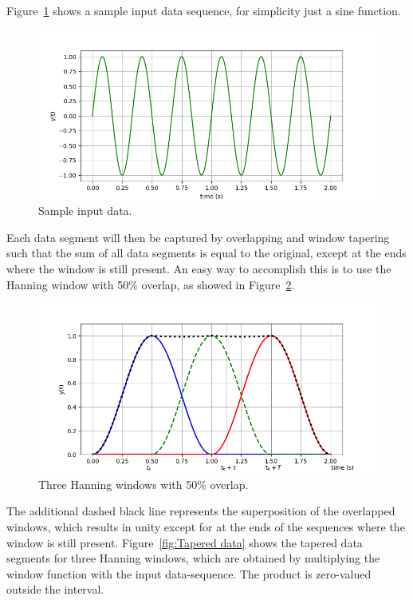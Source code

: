 Figure~\ref{fig:Sample Input} shows a sample input data sequence,
for simplicity just a sine function.
%
\begin{figure}[tb]
\includegraphics[width=\textwidth]{Figures/input}
\caption{Sample input data.}
\label{fig:Sample Input}
\end{figure}
%
Each data segment will then be captured by overlapping and window tapering
such that the sum of all data segments is equal to the original,
except at the ends where the window is still present.
An easy way to accomplish this is to use the Hanning window with 50\% overlap,
as showed in Figure~\ref{fig:Overlapping Hanning}.
%
\begin{figure}[!tb]
\center
\includegraphics[width=\textwidth]{Figures/movingHenning}
\caption{Three Hanning windows with 50\% overlap.}
\label{fig:Overlapping Hanning}
\end{figure}
%
The additional dashed black line represents the superposition of the overlapped
windows, which results in unity except for at the ends of the sequences where
the window is still present.
Figure~\ref{fig:Tapered data} shows the tapered data segments for three
Hanning windows, which are obtained by multiplying the window function
with the input data-sequence.
The product is zero-valued outside the interval.
